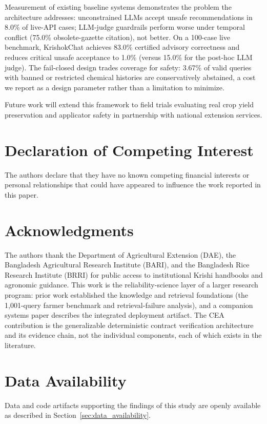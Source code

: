 \documentclass[a4paper,fleqn]{cas-dc}
\begin{document}
Measurement of existing baseline systems demonstrates the problem the architecture addresses: unconstrained LLMs accept unsafe recommendations in 8.0\% of live-API cases; LLM-judge guardrails perform worse under temporal conflict (75.0\% obsolete-gazette citation), not better. On a 100-case live benchmark, KrishokChat achieves 83.0\% certified advisory correctness and reduces critical unsafe acceptance to 1.0\% (versus 15.0\% for the post-hoc LLM judge). The fail-closed design trades coverage for safety: 3.67\% of valid queries with banned or restricted chemical histories are conservatively abstained, a cost we report as a design parameter rather than a limitation to minimize.

Future work will extend this framework to field trials evaluating real crop yield preservation and applicator safety in partnership with national extension services.

\section*{Declaration of Competing Interest}
The authors declare that they have no known competing financial interests or personal relationships that could have appeared to influence the work reported in this paper.

\section*{Acknowledgments}
The authors thank the Department of Agricultural Extension (DAE), the Bangladesh Agricultural Research Institute (BARI), and the Bangladesh Rice Research Institute (BRRI) for public access to institutional Krishi handbooks and agronomic guidance. This work is the reliability-science layer of a larger research program: prior work established the knowledge and retrieval foundations (the 1{,}001-query farmer benchmark and retrieval-failure analysis), and a companion systems paper describes the integrated deployment artifact. The CEA contribution is the generalizable deterministic contract verification architecture and its evidence chain, not the individual components, each of which exists in the literature.

\section*{Data Availability}
Data and code artifacts supporting the findings of this study are openly available as described in Section~\ref{sec:data_availability}.



\end{document}
